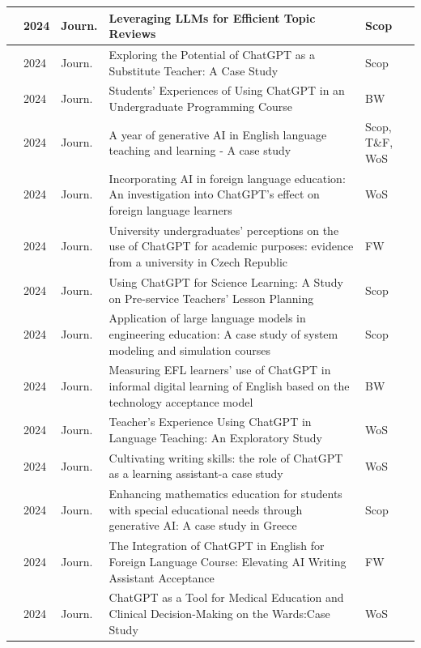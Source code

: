 {\begin{longtable}{|p{}|p{}|p{}|p{}|p{}|}
    \hline
    \cite{Gana.2024}&2024&Journ.&Leveraging LLMs for Efficient Topic Reviews&Scop\\ 
    \hline
    \cite{Ghazali.2024}&2024&Journ.&Exploring the Potential of ChatGPT as a Substitute Teacher: A Case Study&Scop\\ 
    \hline
    \cite{Haindl.2024}&2024&Journ.&Students’ Experiences of Using ChatGPT in an Undergraduate Programming Course&BW\\ 
    \hline
    \cite{Hnz.2024}&2024&Journ.&A year of generative AI in English language teaching and learning - A case study&Scop, T\&F, WoS\\ 
    \hline
    \cite{Karatas.2024}&2024&Journ.&Incorporating AI in foreign language education: An investigation into ChatGPT's effect on foreign language learners&WoS\\ 
    \hline
    \cite{Klimova.2024}&2024&Journ.&University undergraduates’ perceptions on the use of ChatGPT for academic purposes: evidence from a university in Czech Republic&FW\\ 
    \hline
    \cite{Lee.2024}&2024&Journ.&Using ChatGPT for Science Learning: A Study on Pre-service Teachers' Lesson Planning&Scop\\ 
    \hline
    \cite{Liu.2024}&2024&Journ.&Application of large language models in engineering education: A case study of system modeling and simulation courses&Scop\\ 
    \hline
    \cite{Liu.2024b}&2024&Journ.&Measuring EFL learners’ use of ChatGPT in informal digital learning of English based on the technology acceptance model&BW\\ 
    \hline
    \cite{Nugroho.2024}&2024&Journ.&Teacher's Experience Using ChatGPT in Language Teaching: An Exploratory Study&WoS\\ 
    \hline
    \cite{PunarOzcelik.2024}&2024&Journ.&Cultivating writing skills: the role of ChatGPT as a learning assistant-a case study&WoS\\ 
    \hline
    \cite{Rizos.2024}&2024&Journ.&Enhancing mathematics education for students with special educational needs through generative AI: A case study in Greece&Scop\\ 
    \hline
    \cite{Salam.2024}&2024&Journ.&The Integration of ChatGPT in English for Foreign Language Course: Elevating AI Writing Assistant Acceptance&FW\\ 
    \hline
    \cite{Skryd.2024}&2024&Journ.&ChatGPT as a Tool for Medical Education and Clinical Decision-Making on the Wards:Case Study&WoS\\ 

\end{longtable}}
